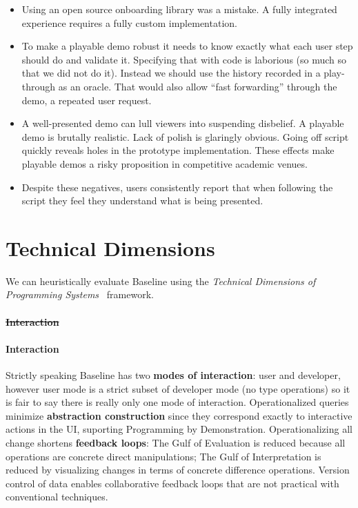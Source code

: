\documentclass[english,submission]{programming}
\theoremstyle{definition}
\newcommand{\myparagraph}[1]{\vspace{-8pt}\paragraph{#1}} %
\providecommand{\DIFdel}[1]{{\protect\color{red}\sout{#1}}} %
\providecommand{\DIFaddbegin}{} %
\providecommand{\DIFaddend}{} %
\providecommand{\DIFdelbegin}{} %
\providecommand{\DIFdelend}{} %
\begin{document}
\begin{itemize}
\item Using an open source onboarding library was a mistake. A fully integrated experience requires a fully custom implementation.
\item To make a playable demo robust it needs to know exactly what each user step should do and validate it. Specifying that with code is laborious (so much so that we did not do it). Instead we should use the history recorded in a play-through as an oracle. That would also allow ``fast forwarding'' through the demo, a repeated user request.
\item A well-presented demo can lull viewers into suspending disbelief. A playable demo is brutally realistic. Lack of polish is glaringly obvious. Going off script quickly reveals holes in the prototype implementation. These effects make playable demos a risky proposition in competitive academic venues.
\item Despite these negatives, users consistently report that when following the script they feel they understand what is being presented.

\end{itemize}




\section{Technical Dimensions}\label{tech-dims}
We can heuristically evaluate Baseline using the \textit{Technical Dimensions of Programming Systems}~\cite{techdims} framework.

\DIFdelbegin \paragraph{\DIFdel{Interaction}} %
\addtocounter{paragraph}{-1}%
\DIFdelend \DIFaddbegin \myparagraph{Interaction} \DIFaddend Strictly speaking Baseline has two \textbf{modes of interaction}: user and developer, however user mode is a strict subset of developer mode (no type operations) so it is fair to say there is really only one mode of interaction.
Operationalized queries minimize \textbf{abstraction construction} since they correspond exactly to interactive actions in the UI, suporting Programming by Demonstration.
Operationalizing all change shortens \textbf{feedback loops}: The Gulf of Evaluation is reduced because all operations are concrete direct manipulations; The Gulf of Interpretation is reduced by visualizing changes in terms of concrete difference operations. Version control of data enables collaborative feedback loops that are not practical with conventional techniques.
\end{document}
